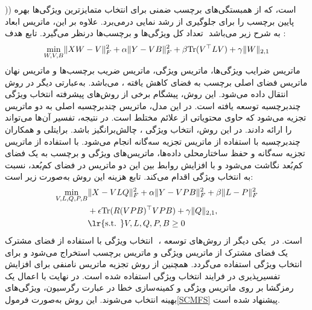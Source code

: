 	)‎) \cite{jian2016multi} 
	است، که از همبستگی‌های برچسب ضمنی برای انتخاب متمایزترین ویژگی‌ها بهره می‌برد. علاوه بر این، 
	ماتریس ابعاد‎‎پایین برچسب را برای جلوگیری از رشد نمایی در تعداد کل ویژگی‌ها و برچسب‌ها درنظر می‌گیرد. تابع هدف  ‎ ‎به شرح زیر می‌باشد :
	\begin{align}
		\min_{\boldmath{W} ,\boldmath{V}, \boldmath{B}}\lVert\boldmath{XW}-\boldmath{V}\rVert^2_F + \alpha\lVert\boldmath{Y}-\boldmath{V}\boldmath{B}\rVert^2_F + 
		\beta\mathrm{Tr}(\boldmath{V}^\top \boldmath{LV}) +\gamma\lVert\boldmath{W}\lVert_{2,1}
	\end{align}
	 ماتریس ضرایب ویژگی‌ها،
	 ماتریس ویژگی،
	 ماتریس ضریب برچسب‌ها و
	 ماتریس نهان می‌باشد.
	به‌عبارتی دیگر در روش ‎‎، ماتریس فضای اصلی برچسب به فضای کاهش یافته انتقال داده می‌شود. این روش، پیشگام برخی از روش‌های پیشرفته انتخاب ویژگی چندبرچسبه توسعه یافته است. در این مدل، ماتریس چند‌برچسبه اصلی به دو ماتریس‌ تجزیه می‌شود که حاوی محتویاتی از علائم مختلط است. در نتیجه، تفسیر آن‌ها می‌تواند چالش‌برانگیز باشد. برایتلی و همکاران‎ \cite{braytee2017multi}، ‎را ارائه دادند. در این روش، انتخاب ویژگی چندبرچسبه با استفاده از ماتریس تجزیه سه‌گانه انجام می‌شود. با استفاده از ماتریس تجزیه سه‌گانه و حفظ ساختارمحلی داده‌ها، ماتریس‌های ویژگی و برچسب به یک فضای کم‌بُعد نگاشت می‌شود و با افزایش روابط بین این دو ماتریس در فضای کم‌بُعد، نسبت به انتخاب ویژگی اقدام می‌کند. تابع هزینه این روش به‌صورت زیر است:
		\begin{align}
		\min_{\boldmath{V} ,\boldmath{L},\boldmath{Q},\boldmath{P},\boldmath{B}}&\lVert\boldmath{X}-\boldmath{VLQ}\rVert^2_F + \alpha\lVert\boldmath{Y}-\boldmath{V}\boldmath{P}\boldmath{B}\rVert^2_F + 
		\beta\lVert\boldmath{L}-\boldmath{P}\rVert^2_F \nonumber\\
		& +\epsilon\mathrm{Tr}(\boldmath{R}(\boldmath{VPB})^\top \boldmath{VPB})  +\gamma\lVert{\boldmath{Q}}\lVert_{2,1},\nonumber\\
		&{\text{\lr{s.t. }}}{\boldmath{V},\boldmath{L},\boldmath{Q},\boldmath{P},\boldmath{B}}\geq 0
	\end{align}
	انتخاب ویژگی با استفاده از فضای مشترک ‎ \cite{hu2020multi}، یکی دیگر از روش‌های توسعه ‎‎ است. در ‎ یک فضای مشترک از ماتریس ویژگی و ماتریس برچسب استخراج می‌شود و برای انتخاب ویژگی استفاده می‌گردد. همچنین از روش تجزیه ماتریس نامنفی برای افزایش تفسیرپذیری در فرایند انتخاب ویژگی استفاده شده است. در نهایت با اعمال یک رمزگشا بر روی ماتریس ویژگی و کمینه‌سازی خطا در عبارت رگرسیون، ویژگی‌های بهینه انتخاب می‌شوند. این روش به‌صورت فرمول\eqref{SCMFS} پیشنهاد شده است.
